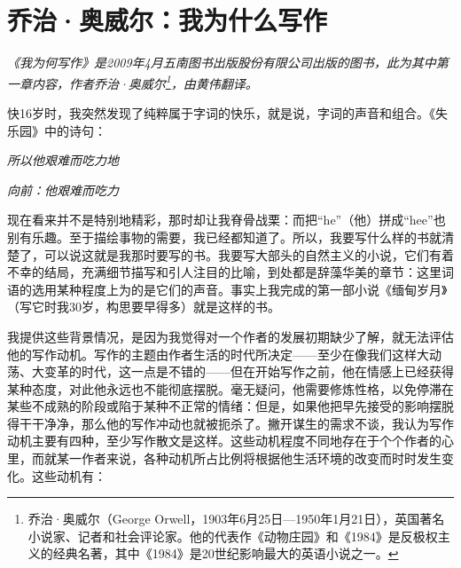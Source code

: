 \documentclass[12pt,a5paper]{ctexbook}
\begin{document}
\newpage

\section{乔治·奥威尔：我为什么写作}

\emph{《我为何写作》是2009年4月五南图书出版股份有限公司出版的图书，此为其中第一章内容，作者乔治·奥威尔\footnote{乔治·奥威尔（George Orwell，1903年6月25日—1950年1月21日），英国著名小说家、记者和社会评论家。他的代表作《动物庄园》和《1984》是反极权主义的经典名著，其中《1984》是20世纪影响最大的英语小说之一。}，由黄伟翻译。}
\vspace{2em}

快16岁时，我突然发现了纯粹属于字词的快乐，就是说，字词的声音和组合。《失乐园》中的诗句：

\centerline{\emph{所以他艰难而吃力地}}
\centerline{\emph{向前：他艰难而吃力}}

现在看来并不是特别地精彩，那时却让我脊骨战栗：而把“he”（他）拼成“hee”也别有乐趣。至于描绘事物的需要，我已经都知道了。所以，我要写什么样的书就清楚了，可以说这就是我那时要写的书。我要写大部头的自然主义的小说，它们有着不幸的结局，充满细节描写和引人注目的比喻，到处都是辞藻华美的章节：这里词语的选用某种程度上为的是它们的声音。事实上我完成的第一部小说《缅甸岁月》（写它时我30岁，构思要早得多）就是这样的书。

我提供这些背景情况，是因为我觉得对一个作者的发展初期缺少了解，就无法评估他的写作动机。写作的主题由作者生活的时代所决定——至少在像我们这样大动荡、大变革的时代，这一点是不错的——但在开始写作之前，他在情感上已经获得某种态度，对此他永远也不能彻底摆脱。毫无疑问，他需要修炼性格，以免停滞在某些不成熟的阶段或陷于某种不正常的情绪：但是，如果他把早先接受的影响摆脱得干干净净，那么他的写作冲动也就被扼杀了。撇开谋生的需求不谈，我认为写作动机主要有四种，至少写作散文是这样。这些动机程度不同地存在于个个作者的心里，而就某一作者来说，各种动机所占比例将根据他生活环境的改变而时时发生变化。这些动机有：
\end{document}
